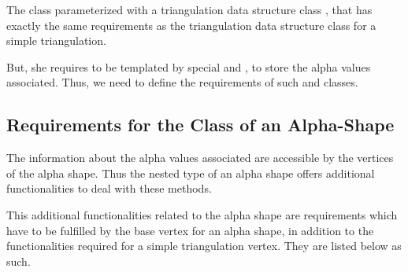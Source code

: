 The class  parameterized with a
triangulation data structure class , that has exactly the same
requirements as the triangulation data structure class for a simple
triangulation.  

But, she requires to be templated by special  and
, to store the alpha values associated. Thus, we need to
define the requirements of such  and
 classes.

\subsection{Requirements for the \protect {} Class of an
Alpha-Shape\label{I1_SectVertex}} 

The information about the alpha values associated  are accessible by the 
vertices of the alpha shape. Thus the nested 
type of an alpha shape offers additional functionalities to deal with these
methods. 

This additional functionalities related to the alpha shape
are requirements which have to be fulfilled
by the base vertex for an alpha shape,
in addition to the functionalities required for a simple triangulation vertex.
They are listed below as such.

\ccInheritsFrom


